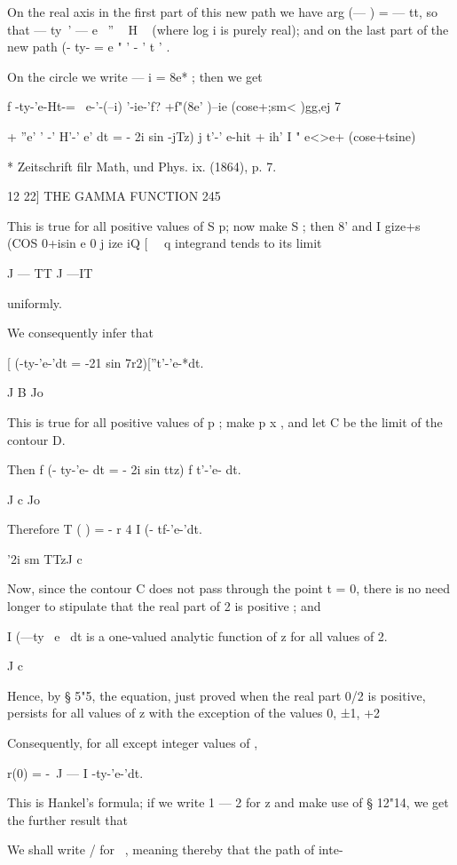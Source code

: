 On the real axis in the first part of this new path we have arg (— ) =
— tt, so that — ty~' — e~ '' ~ H ~ (where log i is purely real); and
on the last part of the new path (- ty- = e " ' - ' t ' .

On the circle we write — i = 8e* ; then we get

f -ty-'e-Ht-= \ e-'-(--i) '-ie-'f? +f"(8e' )--ie (cose+;sm< )gg,ej 7

+ ''e' ' -' H'-' e' dt = - 2i sin -jTz) j t'-' e-hit + ih' I " e<>e+
(cose+tsine) \

* Zeitschrift filr Math, und Phys. ix. (1864), p. 7.



12 22] THE GAMMA FUNCTION 245

This is true for all positive values of S p; now make S ; then 8' and
I gize+s (COS 0+isin e 0 j ize iQ [ \ \ q integrand tends to its limit

J — TT J —IT

uniformly.

We consequently infer that

[ (-ty-'e-'dt = -21 sin 7r2)[''t'-'e-*dt.

J B Jo

This is true for all positive values of p ; make p x , and let C be
the limit of the contour D.




Then f (- ty-'e- dt = - 2i sin ttz) f t'-'e- dt.

J c Jo

Therefore T ( ) = - r 4 I (- tf-'e-'dt.

'2i sm TTzJ c

Now, since the contour C does not pass through the point t = 0, there
is no need longer to stipulate that the real part of 2 is positive ;
and

I (—ty~ e~ dt is a one-valued analytic function of z for all values of
2.

J c

Hence, by § 5"5, the equation, just proved when the real part 0/2 is
positive, persists for all values of z with the exception of the
values 0, ±1, +2

Consequently, for all except integer values of ,

r(0) = -\ J — I -ty-'e-'dt.

This is Hankel's formula; if we write 1 — 2 for z and make use of §
12"14, we get the further result that

We shall write / for \ , meaning thereby that the path of inte-

